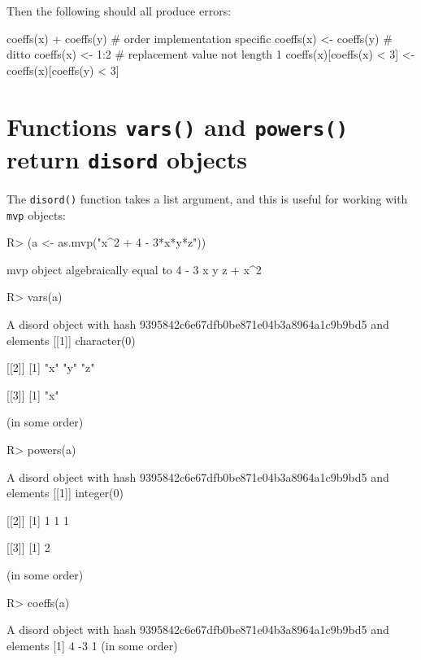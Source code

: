 \documentclass{article}
\begin{document}
Then the following should all produce errors:

\begin{Schunk}
\begin{Sinput}
coeffs(x) + coeffs(y)  # order implementation specific
coeffs(x) <- coeffs(y) # ditto
coeffs(x) <- 1:2       # replacement value not length 1
coeffs(x)[coeffs(x) < 3] <- coeffs(x)[coeffs(y) < 3]
\end{Sinput}
\end{Schunk}

\section{Functions {\tt vars()} and {\tt powers()} return {\tt disord} objects}


The {\tt disord()} function takes a list argument, and this is useful
for working with {\tt mvp} objects:

\begin{Schunk}
\begin{Sinput}
R> (a <- as.mvp("x^2 + 4 - 3*x*y*z"))
\end{Sinput}
\begin{Soutput}
mvp object algebraically equal to
4  -  3 x y z  +  x^2
\end{Soutput}
\begin{Sinput}
R> vars(a)
\end{Sinput}
\begin{Soutput}
A disord object with hash 9395842c6e67dfb0be871e04b3a8964a1c9b9bd5 and elements
[[1]]
character(0)

[[2]]
[1] "x" "y" "z"

[[3]]
[1] "x"

(in some order)
\end{Soutput}
\begin{Sinput}
R> powers(a)
\end{Sinput}
\begin{Soutput}
A disord object with hash 9395842c6e67dfb0be871e04b3a8964a1c9b9bd5 and elements
[[1]]
integer(0)

[[2]]
[1] 1 1 1

[[3]]
[1] 2

(in some order)
\end{Soutput}
\begin{Sinput}
R> coeffs(a)
\end{Sinput}
\begin{Soutput}
A disord object with hash 9395842c6e67dfb0be871e04b3a8964a1c9b9bd5 and elements
[1]  4 -3  1
(in some order)
\end{Soutput}
\end{Schunk}
\end{document}
